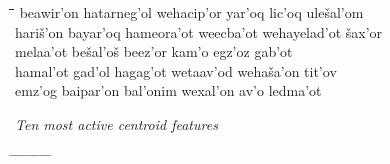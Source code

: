 \begin{figure}[t]
\begin{mdframed}
\begin{tabbing}
\hspace*{15ex}\= \hspace*{15ex}\=\hspace*{15ex}\=\hspace*{15ex}\=\hspace*{15ex}\=\hspace*{15ex} \kill
beawir\a'{o}n \> hatarneg\a'{o}l \> wehacip\a'{o}r \> yar\a'{o}q \> lic\a'{o}q \> ule\v{s}al\a'{o}m \\
hari\v{s}\a'{o}n \> bayar\a'{o}q \> hameora\a'{o}t \> weecba\a'{o}t \> wehayelad\a'{o}t \> \v{s}ax\a'{o}r \\
melaa\a'{o}t \> be\v{s}al\a'{o}\v{s} \> beez\a'{o}r \> kam\a'{o} \> egz\a'{o}z \> gab\a'{o}t \\
hamal\a'{o}t \> gad\a'{o}l \> hagag\a'{o}t \> wetaav\a'{o}d \> weha\v{s}a\a'{o}n \> tit\a'{o}v \\
emz\a'{o}g \> baipar\a'{o}n \> bal\a'{o}nim \> wexal\a'{o}n \> av\a'{o} \> ledma\a'{o}t 
\end{tabbing}
\begin{mdframed}
\begin{small}
\textit{Ten most active centroid features}
\begin{tabbing}
\hspace{7ex} \= \hspace{12ex} \= \hspace{6ex} \= \hspace{12ex} \= \hspace{6ex} \= \hspace{12ex} \= \hspace{6ex} \= \hspace{12ex} \= \hspace{6ex} \= \hspace{12ex} \kill

\end{tabbing}
\end{small}
\end{mdframed}
\end{mdframed}
\end{figure}
